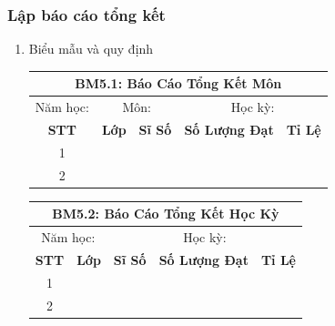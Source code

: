 \documentclass[a4paper]{article}
\begin{document}
	\subsubsection{Lập báo cáo tổng kết}
		\begin{enumerate}[label=\alph*.]
\item Biểu mẫu và quy định
\begin{table}[H]
    \centering
    \renewcommand{\arraystretch}{1.5}
    \setlength{\tabcolsep}{15pt} %
    \begin{tabular}{|c|c|c|c|c|}
    \hline
    \multicolumn{5}{|c|}{\textbf{BM5.1: Báo Cáo Tổng Kết Môn}} \\  
    \hline
    Năm học: & \multicolumn{2}{|c|}{Môn:} & \multicolumn{2}{c|}{Học kỳ: } \\  
    \hline
    \textbf{STT} & \textbf{Lớp} & \textbf{Sĩ Số} & \textbf{Số Lượng Đạt} & \textbf{Tỉ Lệ} \\  
    \hline
    1 & & & & \\  
    \hline
    2 & & & & \\  
    \hline
    \end{tabular}
\end{table}
	

\begin{table}[H]
    \centering
    \renewcommand{\arraystretch}{1.5}
    \setlength{\tabcolsep}{15pt} %
    \begin{tabular}{|c|c|c|c|c|}
    \hline
    \multicolumn{5}{|c|}{\textbf{BM5.2: Báo Cáo Tổng Kết Học Kỳ}} \\  
    \hline
      \multicolumn{2}{|c|}{Năm học: } &  \multicolumn{3}{|c|}{Học kỳ: } \\  
    \hline
    \textbf{STT} & \textbf{Lớp} & \textbf{Sĩ Số} & \textbf{Số Lượng Đạt} & \textbf{Tỉ Lệ} \\  
    \hline
    1 & & & & \\  
    \hline
    2 & & & & \\  
    \hline
    \end{tabular}
\end{table}


\end{enumerate}
\end{document}
